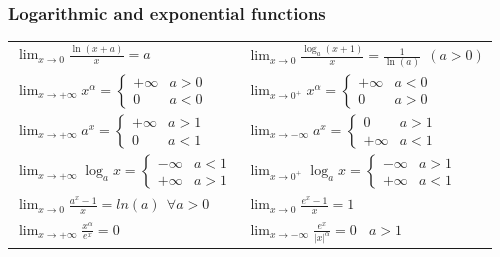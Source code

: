 \subsubsection{Logarithmic and exponential functions}
\begin{tabularx}{\textwidth}{ X X }
	
$ \displaystyle \lim_{x\rightarrow0}\frac{\ln(x+a)}{x}=a $ &
$ \displaystyle \lim_{x\rightarrow0}\frac{\log_a(x+1)}{x}=\frac{1}{\ln(a)} ~~ (a>0) $ \\ [2ex]

$ \displaystyle \lim_{x\rightarrow+\infty}x^\alpha= \begin{cases}
+\infty & a>0 \\
0 & a<0
\end{cases} $ & 
$ \displaystyle \lim_{x\rightarrow0^+}x^\alpha= \begin{cases}
+\infty & a<0 \\
0 & a>0
\end{cases} $ \\ [2.2ex]

$ \displaystyle \lim_{x\rightarrow+\infty}a^x= \begin{cases}
+\infty & a>1 \\
0 & a<1
\end{cases} $ & 
$ \displaystyle \lim_{x\rightarrow-\infty}a^x= \begin{cases}
0 & a>1 \\
+\infty & a<1 
\end{cases} $ \\ [2.2ex]

$ \displaystyle \lim_{x\rightarrow+\infty}\log_ax= \begin{cases}
-\infty & a<1 \\
+\infty & a>1 
\end{cases} $ & 
$ \displaystyle \lim_{x\rightarrow 0^+}\log_ax= \begin{cases}
-\infty & a>1 \\
+\infty & a<1 
\end{cases} $ \\ [2.2ex]

$ \displaystyle\lim_{x\rightarrow0}\frac{a^x-1}{x}=ln(a) ~~ \forall a>0 $ &
 $ \displaystyle \lim_{x\rightarrow0}\frac{e^x-1}{x}=1 $ \\[2ex]

$ \displaystyle
\lim_{x\rightarrow+\infty}\frac{x^\alpha}{e^x}=0 $ &
$ \displaystyle \lim_{x\rightarrow-\infty}\frac{e^x}{\left|x\right|^\alpha}=0 ~~~~ a>1 $ \\ [2ex]


\end{tabularx}
